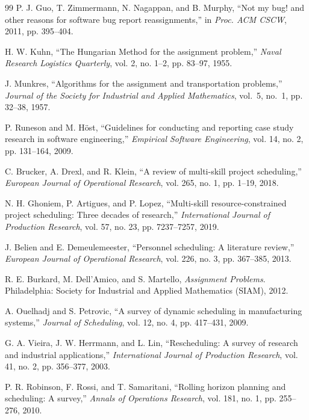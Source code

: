 \documentclass[final,1p,times]{elsarticle}
\begin{document}
\begin{thebibliography}{99}
P. J. Guo, T. Zimmermann, N. Nagappan, and B. Murphy, ``Not my bug! and other reasons for software bug report reassignments,'' in \emph{Proc. ACM CSCW}, 2011, pp. 395–404.

H. W. Kuhn, ``The Hungarian Method for the assignment problem,'' \emph{Naval Research Logistics Quarterly}, vol. 2, no. 1–2, pp. 83–97, 1955.

J. Munkres, ``Algorithms for the assignment and transportation problems,'' 
\emph{Journal of the Society for Industrial and Applied Mathematics}, 
vol.~5, no.~1, pp. 32--38, 1957.

P. Runeson and M. Höst, ``Guidelines for conducting and reporting case study research in software engineering,'' \emph{Empirical Software Engineering}, vol. 14, no. 2, pp. 131--164, 2009.

C. Brucker, A. Drexl, and R. Klein, ``A review of multi-skill project scheduling,'' \emph{European Journal of Operational Research}, vol. 265, no. 1, pp. 1--19, 2018.

N. H. Ghoniem, P. Artigues, and P. Lopez, ``Multi-skill resource-constrained project scheduling: Three decades of research,'' \emph{International Journal of Production Research}, vol. 57, no. 23, pp. 7237--7257, 2019.

J. Belien and E. Demeulemeester, ``Personnel scheduling: A literature review,'' \emph{European Journal of Operational Research}, vol. 226, no. 3, pp. 367--385, 2013.

R. E. Burkard, M. Dell’Amico, and S. Martello, \emph{Assignment Problems}. Philadelphia: Society for Industrial and Applied Mathematics (SIAM), 2012.

A. Ouelhadj and S. Petrovic, ``A survey of dynamic scheduling in manufacturing systems,'' \emph{Journal of Scheduling}, vol. 12, no. 4, pp. 417--431, 2009.

G. A. Vieira, J. W. Herrmann, and L. Lin, ``Rescheduling: A survey of research and industrial applications,'' \emph{International Journal of Production Research}, vol. 41, no. 2, pp. 356--377, 2003.

P. R. Robinson, F. Rossi, and T. Samaritani, ``Rolling horizon planning and scheduling: A survey,'' \emph{Annals of Operations Research}, vol. 181, no. 1, pp. 255--276, 2010.


\end{thebibliography}
\end{document}

